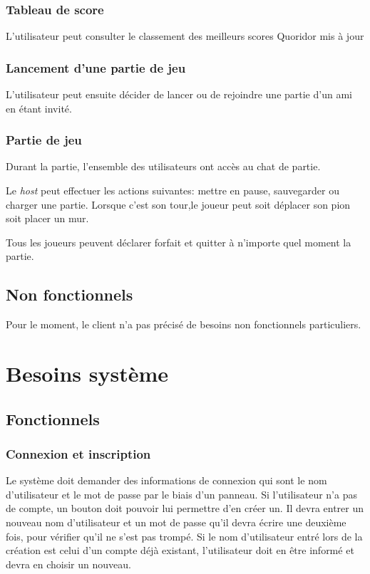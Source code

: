 \documentclass[a4paper,10pt]{article}
\begin{document}
\subsubsection{Tableau de score}
L'utilisateur peut consulter le classement des meilleurs scores Quoridor mis à jour

\subsubsection{Lancement d'une partie de jeu}
L'utilisateur peut ensuite décider de lancer ou de rejoindre une partie d'un ami en étant invité.
\subsubsection{Partie de jeu}

Durant la partie, l'ensemble des utilisateurs ont accès au chat de partie.

Le \textit{host} peut effectuer les actions suivantes: mettre en pause, sauvegarder ou charger une partie.
Lorsque c'est son tour,le joueur peut soit déplacer son pion soit placer un mur.

Tous les joueurs peuvent déclarer forfait et quitter à n'importe quel moment la partie.

\subsection{Non fonctionnels}
Pour le moment, le client n'a pas précisé de besoins non fonctionnels particuliers.

\section{Besoins système}

\subsection{Fonctionnels}

\subsubsection{Connexion et inscription}
Le système doit demander des informations de connexion qui sont le nom d'utilisateur et le mot de passe par le biais d'un panneau. Si l'utilisateur n'a pas de compte, un bouton doit pouvoir lui permettre d'en créer un. Il devra entrer un nouveau nom d'utilisateur et un mot de passe qu'il devra écrire une deuxième fois, pour vérifier qu'il ne s'est pas trompé. Si le nom d'utilisateur entré lors de la création est celui d'un compte déjà existant, l'utilisateur doit en être informé et devra en choisir un nouveau.
\end{document}
